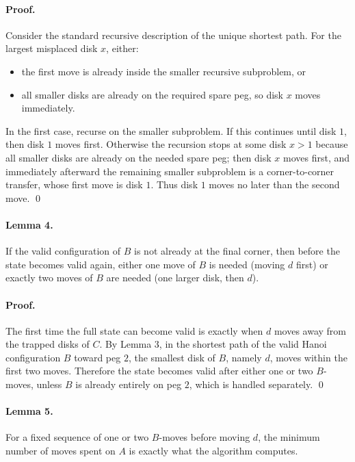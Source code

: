 \documentclass[11pt]{article}
\begin{document}
\paragraph{Proof.}
Consider the standard recursive description of the unique shortest path. For the largest misplaced disk $x$, either:
\begin{itemize}[leftmargin=*]
    \item the first move is already inside the smaller recursive subproblem, or
    \item all smaller disks are already on the required spare peg, so disk $x$ moves immediately.
\end{itemize}
In the first case, recurse on the smaller subproblem. If this continues until disk $1$, then disk $1$ moves first. Otherwise the recursion stops at some disk $x>1$ because all smaller disks are already on the needed spare peg; then disk $x$ moves first, and immediately afterward the remaining smaller subproblem is a corner-to-corner transfer, whose first move is disk $1$. Thus disk $1$ moves no later than the second move. \qed

\paragraph{Lemma 4.}
If the valid configuration of $B$ is not already at the final corner, then before the state becomes valid again, either one move of $B$ is needed (moving $d$ first) or exactly two moves of $B$ are needed (one larger disk, then $d$).

\paragraph{Proof.}
The first time the full state can become valid is exactly when $d$ moves away from the trapped disks of $C$. By Lemma 3, in the shortest path of the valid Hanoi configuration $B$ toward peg $2$, the smallest disk of $B$, namely $d$, moves within the first two moves. Therefore the state becomes valid after either one or two $B$-moves, unless $B$ is already entirely on peg $2$, which is handled separately. \qed

\paragraph{Lemma 5.}
For a fixed sequence of one or two $B$-moves before moving $d$, the minimum number of moves spent on $A$ is exactly what the algorithm computes.
\end{document}
